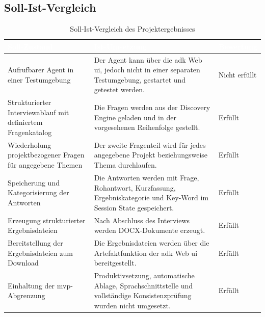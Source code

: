 \documentclass[
  10pt,
  ngerman,
  a4paper,
  toc=graduated,
  numbers=noenddot,
  headings=standardclasses,
  nonumberlist
]{scrartcl}
\begin{document}
\newpage
\subsection{Soll-Ist-Vergleich}
\label{anhang_soll-ist-vergleich}

\begin{table}[H]
\centering
\begin{tabularx}{\textwidth}{|L{4.2cm}|Y|L{2.2cm}|}
\hline
{}
\textcolor{white}{\textbf{Soll-Zustand}} 
& \textcolor{white}{\textbf{Ist-Umsetzung}} 
& \textcolor{white}{\textbf{Bewertung}} \\
\hline

Aufrufbarer Agent in einer Testumgebung 
& Der Agent kann über die \gls{adk} Web \gls{ui}, jedoch nicht in einer separaten Testumgebung, gestartet und getestet werden. 
& Nicht erfüllt \\
\hline

Strukturierter Interviewablauf mit definiertem Fragenkatalog 
& Die Fragen werden aus der Discovery Engine geladen und in der vorgesehenen Reihenfolge gestellt. 
& Erfüllt \\
\hline

Wiederholung projektbezogener Fragen für angegebene Themen 
& Der zweite Fragenteil wird für jedes angegebene Projekt beziehungsweise Thema durchlaufen. 
& Erfüllt \\
\hline

Speicherung und Kategorisierung der Antworten 
& Die Antworten werden mit Frage, Rohantwort, Kurzfassung, Ergebniskategorie und Key-Word im Session State gespeichert. 
& Erfüllt \\
\hline

Erzeugung strukturierter Ergebnisdateien 
& Nach Abschluss des Interviews werden DOCX-Dokumente erzeugt.
& Erfüllt \\
\hline

Bereitstellung der Ergebnisdateien zum Download 
& Die Ergebnisdateien werden über die Artefaktfunktion der \gls{adk} Web \gls{ui} bereitgestellt. 
& Erfüllt \\
\hline

Einhaltung der \gls{mvp}-Abgrenzung 
& Produktivsetzung, automatische Ablage, Sprachschnittstelle und vollständige Konsistenzprüfung wurden nicht umgesetzt. 
& Erfüllt \\
\hline

\end{tabularx}
\caption{Soll-Ist-Vergleich des Projektergebnisses}
\label{tab:soll_ist_vergleich}
\end{table}
\end{document}
